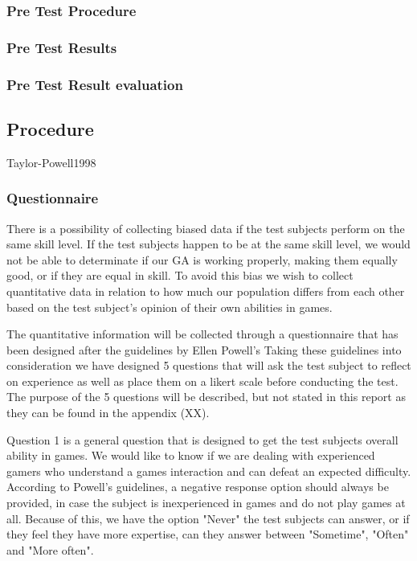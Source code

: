 \subsubsection{Pre Test Procedure}
\subsubsection{Pre Test Results}
\subsubsection{Pre Test Result evaluation}

\subsection{Procedure}
Taylor-Powell1998
\subsubsection{Questionnaire}
There is a possibility of collecting biased data if the test subjects perform on the same skill level. 
If the test subjects happen to be at the same skill level, we would not be able to determinate if our GA is working properly, making them equally good, or if they are equal in skill. To avoid this bias we wish to collect quantitative data in relation to how much our population differs from each other based on the test subject's opinion of their own abilities in games. 

The quantitative information will be collected through a questionnaire that has been designed after the guidelines by Ellen Powell's  \cite{Taylor-Powell1998} Taking these guidelines into consideration we have designed 5 questions that will ask the test subject to reflect on experience as well as place them on a likert scale before conducting the test. The purpose of the 5 questions will be described, but not stated in this report as they can be found in the appendix (XX). 

Question 1 is a general question that is designed to get the test subjects overall ability in games. We would like to know if we are dealing with experienced gamers who understand a games interaction and can defeat an expected difficulty. According to Powell's guidelines, a negative response option should always be provided, in case the subject is inexperienced in games and do not play games at all. Because of this, we have the option "Never" the test subjects can answer, or if they feel they have more expertise, can they answer between "Sometime", "Often" and "More often". 

